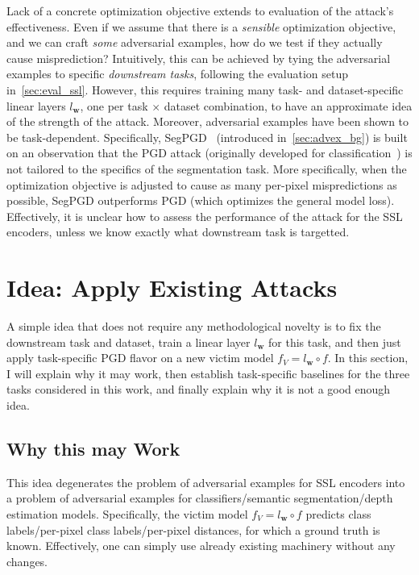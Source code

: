 Lack of a concrete optimization objective extends to evaluation of the attack's effectiveness. Even if we assume that there is a \textit{sensible} optimization objective, and we can craft \textit{some} adversarial examples, how do we test if they actually cause misprediction? Intuitively, this can be achieved by tying the adversarial examples to specific \textit{downstream tasks}, following the evaluation setup in~\cref{sec:eval_ssl}. However, this requires training many task- and dataset-specific linear layers $l_\mathbf{w}$, one per task $\times$ dataset combination, to have an approximate idea of the strength of the attack. Moreover, adversarial examples have been shown to be task-dependent. Specifically, SegPGD~\cite{segpgd} (introduced in~\cref{sec:advex_bg}) is built on an observation that the PGD attack (originally developed for classification~\cite{pgd}) is not tailored to the specifics of the segmentation task. More specifically, when the optimization objective is adjusted to cause as many per-pixel mispredictions as possible, SegPGD outperforms PGD (which optimizes the general model loss). Effectively, it is unclear how to assess the performance of the attack for the SSL encoders, unless we know exactly what downstream task is targetted.

\section{Idea: Apply Existing Attacks}\label{sec:pgd_baselines}

A simple idea that does not require any methodological novelty is to fix the downstream task and dataset, train a linear layer $l_\mathbf{w}$ for this task, and then just apply task-specific PGD flavor on a new victim model $f_V=l_\mathbf{w}\circ f$. In this section, I will explain why it may work, then establish task-specific baselines for the three tasks considered in this work, and finally explain why it is not a good enough idea.

\subsection{Why this may Work}

This idea degenerates the problem of adversarial examples for SSL encoders into a problem of adversarial examples for classifiers/semantic segmentation/depth estimation models. Specifically, the victim model $f_V=l_\mathbf{w}\circ f$ predicts class labels/per-pixel class labels/per-pixel distances, for which a ground truth is known. Effectively, one can simply use already existing machinery without any changes. 

